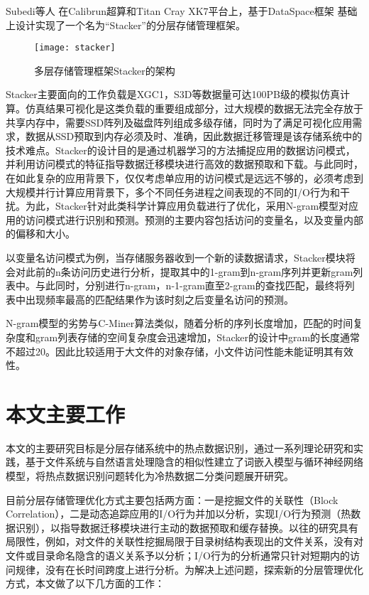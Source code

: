Subedi等人\cite{stacker}
在Calibrun超算和Titan Cray XK7平台上，基于DataSpace框架\cite{dataspace}
基础上设计实现了一个名为“Stacker”的分层存储管理框架。
\begin{figure}[htp]
\centering
\texttt{[image: stacker]}
\caption{多层存储管理框架Stacker的架构}
\label{fig:stacker}
\end{figure}

Stacker主要面向的工作负载是XGC1\cite{XGC1}，S3D\cite{S3D}等数据量可达100PB级的模拟仿真计算。仿真结果可视化是这类负载的重要组成部分，过大规模的数据无法完全存放于共享内存中，需要SSD阵列及磁盘阵列组成多级存储，同时为了满足可视化应用需求，数据从SSD预取到内存必须及时、准确，因此数据迁移管理是该存储系统中的技术难点。Stacker的设计目的是通过机器学习的方法捕捉应用的数据访问模式，并利用访问模式的特征指导数据迁移模块进行高效的数据预取和下载。与此同时，在如此复杂的应用背景下，仅仅考虑单应用的访问模式是远远不够的，必须考虑到大规模并行计算应用背景下，多个不同任务进程之间表现的不同的I/O行为和干扰。为此，Stacker针对此类科学计算应用负载进行了优化，采用N-gram模型对应用的访问模式进行识别和预测。预测的主要内容包括访问的变量名，以及变量内部的偏移和大小。

以变量名访问模式为例，当存储服务器收到一个新的读数据请求，Stacker模块将会对此前的n条访问历史进行分析，提取其中的1-gram到n-gram序列并更新gram列表中。与此同时，分别进行n-gram，n-1-gram直至2-gram的查找匹配，最终将列表中出现频率最高的匹配结果作为该时刻之后变量名访问的预测。

N-gram模型的劣势与C-Miner算法类似，随着分析的序列长度增加，匹配的时间复杂度和gram列表存储的空间复杂度会迅速增加，Stacker的设计中gram的长度通常不超过20。因此比较适用于大文件的对象存储，小文件访问性能未能证明其有效性。




\section{本文主要工作}
本文的主要研究目标是分层存储系统中的热点数据识别，通过一系列理论研究和实践，基于文件系统与自然语言处理隐含的相似性建立了词嵌入模型与循环神经网络模型，将热点数据识别问题转化为冷热数据二分类问题展开研究。

目前分层存储管理优化方式主要包括两方面：一是挖掘文件的关联性（Block Correlation），二是动态追踪应用的I/O行为并加以分析，实现I/O行为预测（热数据识别），以指导数据迁移模块进行主动的数据预取和缓存替换。以往的研究具有局限性，例如，对文件的关联性挖掘局限于目录树结构表现出的文件关系，没有对文件或目录命名隐含的语义关系予以分析；I/O行为的分析通常只针对短期内的访问规律，没有在长时间跨度上进行分析。为解决上述问题，探索新的分层管理优化方式，本文做了以下几方面的工作：

